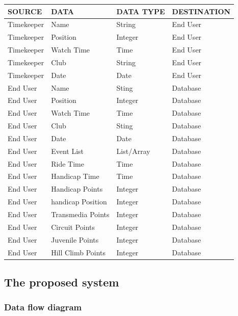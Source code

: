 \begin{tabular}{|l|l|l|l|}
\hline
SOURCE & DATA & DATA TYPE & DESTINATION  \\ \hline
Timekeeper & Name & String & End User  \\ \hline
Timekeeper & Position & Integer & End User  \\ \hline
Timekeeper & Watch Time & Time & End User  \\ \hline
Timekeeper & Club & String & End User  \\ \hline
Timekeeper & Date & Date& End User  \\ \hline
End User & Name & Sting & Database   \\ \hline
End User & Position & Integer & Database  \\ \hline
End User & Watch Time & Time & Database  \\ \hline
End User & Club & Sting & Database  \\ \hline
End User & Date & Date & Database  \\ \hline
End User & Event List & List/Array & Database  \\ \hline
End User & Ride Time & Time & Database  \\ \hline
End User & Handicap Time & Time & Database  \\ \hline
End User & Handicap Points & Integer & Database  \\ \hline
End User & handicap Position & Integer & Database  \\ \hline
End User & Transmedia Points & Integer & Database  \\ \hline
End User & Circuit Points & Integer & Database \\ \hline
End User & Juvenile Points & Integer & Database  \\ \hline
End User & Hill Climb Points & Integer & Database  \\ \hline
\end{tabular}
\subsection{The proposed system}


\subsubsection{Data flow diagram}

